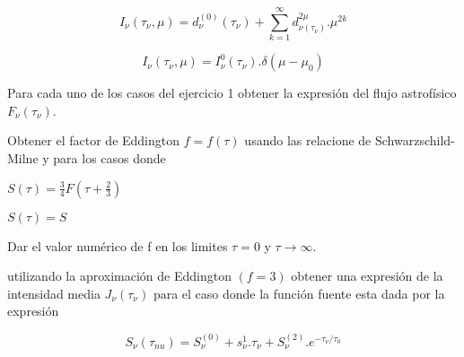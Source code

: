 \documentclass[12pt,spanish,a4paper]{practice}
\begin{document}
\begin{problem}
        \begin{ppart}\label{prob:1:d}
            \begin{equation*}
                I_{\nu}(\tau_{\nu},\mu) = d_{\nu}^{(0)}(\tau_{\nu}) + \sum_{k=1}^{\infty} d_{\nu (\tau_{\nu})}^{2\mu} . \mu^{2k}
            \end{equation*}
        \end{ppart}

        \begin{ppart}\label{prob:1:e}
            \begin{equation*}
                I_{\nu}(\tau_{\nu},\mu) = I_{\nu}^{0}(\tau_{\nu}) . \delta(\mu - \mu_{0})
            \end{equation*}
        \end{ppart}
    \end{problem}

    \begin{problem}\label{prob:2}
        Para cada uno de los casos del ejercicio 1 obtener la expresión del flujo astrofísico $F_{\nu}(\tau_{\nu})$.
    \end{problem}

    \begin{problem}\label{prob:3}
        Obtener el factor de Eddington $f=f(\tau)$ usando las relacione de Schwarzschild-Milne y para los casos donde

        \begin{ppart}\label{prob:3:a}
                $S(\tau) = \frac{3}{4}F(\tau + \frac{2}{3})$
        \end{ppart}

        \begin{ppart}\label{prob:3:b}
            $S(\tau) = S$
        \end{ppart}


        Dar el valor numérico de f en los limites $\tau = 0$ y $\tau \to \infty$.
    \end{problem}

    \begin{problem}\label{prob:4}

        utilizando la aproximación de Eddington $(f = 3)$ obtener una expresión de la intensidad media $J_{\nu}(\tau_{\nu})$ para el caso donde la función fuente esta dada por la expresión

        $$S_{\nu}(\tau_{nu}) = S_{\nu}^{(0)} + s_{\nu}^{1}.\tau_{\nu} + S_{\nu}^{(2)}.e^{-\tau_{\nu} / \tau_{0}}$$

    \end{problem}
\end{document}
